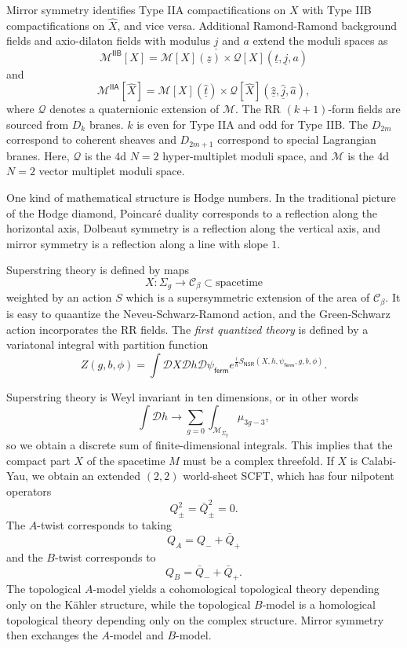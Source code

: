 \documentclass[10pt]{amsart}
\theoremstyle{definition}
\theoremstyle{remark}
\theoremstyle{plain}
\theoremstyle{definition}
\theoremstyle{remark}
\newcommand{\mc}[1]{\mathcal{#1}}
\newcommand{\ut}{\ul{t}}
\newcommand{\uz}{\ul{z}}
\newcommand{\ur}{\ul{j}}
\newcommand{\ms}[1]{\mathsf{#1}}
\newcommand{\ul}[1]{\underline{#1}}
\newcommand{\1}{\mathbf{1}}
\newcommand{\2}{\mathbf{2}}
\newcommand{\3}{\mathbf{3}}
\newcommand{\IIA}{\ms{IIA}}
\newcommand{\IIB}{\ms{IIB}}
\begin{document}
Mirror symmetry identifies Type IIA compactifications on $X$ with Type IIB compactifications on $\hat{X}$, and vice versa. Additional Ramond-Ramond background fields and axio-dilaton fields with modulus $\ur$ and $a$ extend the moduli spaces as
\[ \mc{M}^{\IIB}[X] = \mc{M}[X](\uz) \times \mc{Q}[X](\ut, \ur, a) \]
and 
\[ \mc{M}^{\IIA}[\hat{X}] = \mc{M}[X](\hat{\ut}) \times \mc{Q}[\hat{X}](\hat{\uz}, \hat{\ur}, \hat{a}), \]
where $\mc{Q}$ denotes a quaternionic extension of $\mc{M}$. The RR $(k+1)$-form fields are sourced from $D_k$ branes. $k$ is even for Type IIA and odd for Type IIB. The $D_{2m}$ correspond to coherent sheaves and $D_{2m+1}$ correspond to special Lagrangian branes. Here, $\mc{Q}$ is the $4$d $N=2$ hyper-multiplet moduli space, and $\mc{M}$ is the $4$d $N=2$ vector multiplet moduli space.

One kind of mathematical structure is Hodge numbers. In the traditional picture of the Hodge diamond, Poincar\'e duality corresponds to a reflection along the horizontal axis, Dolbeaut symmetry is a reflection along the vertical axis, and mirror symmetry is a reflection along a line with slope $1$.

Superstring theory is defined by maps
\[ X \colon \Sigma_g \to \mc{C}_{\beta} \subset \text{spacetime} \]
weighted by an action $S$ which is a supersymmetric extension of the area of $\mc{C}_{\beta}$. It is easy to quaantize the Neveu-Schwarz-Ramond action, and the Green-Schwarz action incorporates the RR fields. The \textit{first quantized theory} is defined by a variatonal integral with partition function
\[ Z(g,b,\phi) = \int \mc{D}X \mc{D}h \mc{D}\psi_{\ms{ferm}} e^{\frac{i}{\hbar} S_{\ms{NSR}}(X,h,\psi_{\ms{ferm}},g,b,\phi)}. \]

Superstring theory is Weyl invariant in ten dimensions, or in other words
\[ \int \mc{D}h \to \sum_{g = 0} \int_{\mc{M}_{\Sigma_g}} \mu_{3g-3}, \]
so we obtain a discrete sum of finite-dimensional integrals. This implies that the compact part $X$ of the spacetime $M$ must be a complex threefold. If $X$ is Calabi-Yau, we obtain an extended $(2,2)$ world-sheet SCFT, which has four nilpotent operators
\[ Q_{\pm}^2 = \bar{Q}_{\pm}^2 = 0. \]
The $A$-twist corresponds to taking
\[ Q_A = Q_- + \bar{Q}_+ \]
and the $B$-twist corresponds to
\[ Q_B = \bar{Q}_- + \bar{Q}_+. \]
The topological $A$-model yields a cohomological topological theory depending only on the K\"ahler structure, while the topological $B$-model is a homological topological theory depending only on the complex structure. Mirror symmetry then exchanges the $A$-model and $B$-model.
\end{document}
